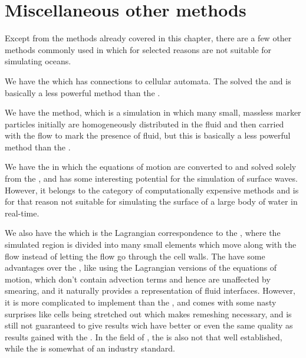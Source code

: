 \section{Miscellaneous other methods}

Except from the methods already covered in this chapter, there are a few other methods commonly used in \CFD which for selected reasons are not suitable for simulating oceans.

We have the \LBM which has connections to cellular automata. The \LBM solved the  and is basically a less powerful \CFD method than the \FVM.

We have the \MAC method, which is a \FVM simulation in which many small, massless marker particles initially are homogeneously distributed in the fluid and then carried with the flow to mark the presence of fluid, but this is basically a less powerful method than the .

We have the \BEM in which the equations of motion are converted to  and solved solely from the \boundaries, and has some interesting potential for the simulation of surface waves. However, it belongs to the category of computationally expensive methods and is for that reason not suitable for simulating the surface of a large body of water in real-time.

We also have the \FEM which is the Lagrangian correspondence to the \FVM, where the simulated region is divided into many small elements which move along with the flow instead of letting the flow go through the cell walls. The \FEM have some advantages over the \FVM, like using the Lagrangian versions of the equations of motion, which don't contain advection terms and hence are unaffected by smearing, and it naturally provides a representation of fluid interfaces. However, it is more complicated to implement than the \FVM, and comes with some nasty surprises like cells being stretched out which makes remeshing necessary, and is still not guaranteed to give results wich have better or even the same quality as results gained with the \FVM. In the field of \CFD, the \FEM is also not that well established, while the \FVM is somewhat of an industry standard.